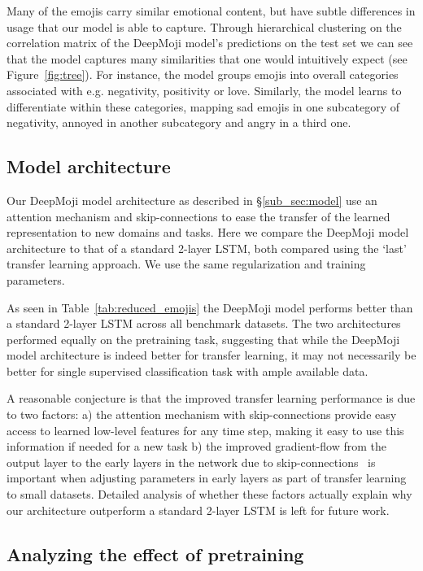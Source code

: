 \documentclass[11pt,a4paper]{article}
\begin{document}
Many of the emojis carry similar emotional content, but have subtle differences in usage that our model is able to capture. Through hierarchical clustering on the correlation matrix of the DeepMoji model's predictions on the test set we can see that the model captures many similarities that one would intuitively expect (see Figure~\ref{fig:tree}). For instance, the model groups emojis into overall categories associated with e.g. negativity, positivity or love. Similarly, the model learns to differentiate within these categories, mapping sad emojis in one subcategory of negativity, annoyed in another subcategory and angry in a third one. 

\subsection{Model architecture}
\label{sub_sec:analysis_model_architecture}

Our DeepMoji model architecture as described in \S\ref{sub_sec:model} use an attention mechanism and skip-connections to ease the transfer of the learned representation to new domains and tasks. Here we compare the DeepMoji model architecture to that of a standard 2-layer LSTM, both compared using the `last' transfer learning approach. We use the same regularization and training parameters.

As seen in Table~\ref{tab:reduced_emojis} the DeepMoji model performs better than a standard 2-layer LSTM across all benchmark datasets. The two architectures performed equally on the pretraining task, suggesting that while the DeepMoji model architecture is indeed better for transfer learning, it may not necessarily be better for single supervised classification task with ample available data.

A reasonable conjecture is that the improved transfer learning performance is due to two factors: a) the attention mechanism with skip-connections provide easy access to learned low-level features for any time step, making it easy to use this information if needed for a new task b) the improved gradient-flow from the output layer to the early layers in the network due to skip-connections~\cite{graves2013generating} is important when adjusting parameters in early layers as part of transfer learning to small datasets. Detailed analysis of whether these factors actually explain why our architecture outperform a standard 2-layer LSTM is left for future work.

\subsection{Analyzing the effect of pretraining}
\label{sub_sec:understanding_pretraining}
\end{document}
